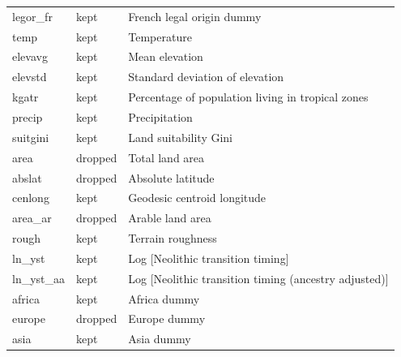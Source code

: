 \begin{tabular}{lll}
 legor\_fr                       & kept     & French legal origin dummy                                                \\
 temp                           & kept     & Temperature                                                              \\
 elevavg                        & kept     & Mean elevation                                                           \\
 elevstd                        & kept     & Standard deviation of elevation                                          \\
 kgatr                          & kept     & Percentage of population living in tropical zones                        \\
 precip                         & kept     & Precipitation                                                            \\
 suitgini                       & kept     & Land suitability Gini                                                    \\
 area                           & dropped  & Total land area                                                          \\
 abslat                         & dropped  & Absolute latitude                                                        \\
 cenlong                        & kept     & Geodesic centroid longitude                                              \\
 area\_ar                        & dropped  & Arable land area                                                         \\
 rough                          & kept     & Terrain roughness                                                        \\
 ln\_yst                         & kept     & Log [Neolithic transition timing]                                        \\
 ln\_yst\_aa                      & kept     & Log [Neolithic transition timing (ancestry adjusted)]                    \\
 africa                         & kept     & Africa dummy                                                             \\
 europe                         & dropped  & Europe dummy                                                             \\
 asia                           & kept     & Asia dummy                                                               \\

\end{tabular}
